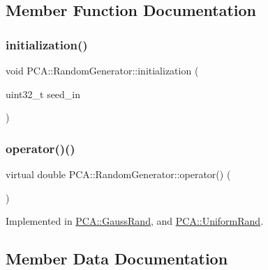 \subsection{Member Function Documentation}
\hypertarget{class_p_c_a_1_1_random_generator_aa2ea4616dd82da5cf66b8232697ecba8}{}\label{class_p_c_a_1_1_random_generator_aa2ea4616dd82da5cf66b8232697ecba8} 
\subsubsection{\texorpdfstring{initialization()}{initialization()}}
{\footnotesize\ttfamily void P\+C\+A\+::\+Random\+Generator\+::initialization (\begin{DoxyParamCaption}\item[{uint32\+\_\+t}]{seed\+\_\+in }\end{DoxyParamCaption})\hspace{0.3cm}{\ttfamily [static]}}

\hypertarget{class_p_c_a_1_1_random_generator_a4361e39397900ae1e7b2cfa91a592509}{}\label{class_p_c_a_1_1_random_generator_a4361e39397900ae1e7b2cfa91a592509} 
\subsubsection{\texorpdfstring{operator()()}{operator()()}}
{\footnotesize\ttfamily virtual double P\+C\+A\+::\+Random\+Generator\+::operator() (\begin{DoxyParamCaption}{ }\end{DoxyParamCaption})\hspace{0.3cm}{\ttfamily [pure virtual]}}



Implemented in \hyperlink{class_p_c_a_1_1_gauss_rand_a594130952a4999972f08b429ea6af959}{P\+C\+A\+::\+Gauss\+Rand}, and \hyperlink{class_p_c_a_1_1_uniform_rand_a25b9b060f2201800a5badfa2b70d0eed}{P\+C\+A\+::\+Uniform\+Rand}.



\subsection{Member Data Documentation}
\hypertarget{class_p_c_a_1_1_random_generator_abfbe847dad295b691364d0197283afb7}{}\label{class_p_c_a_1_1_random_generator_abfbe847dad295b691364d0197283afb7} 
